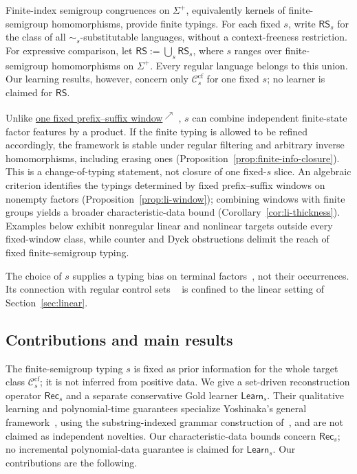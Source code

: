 \documentclass[11pt,a4paper]{article}
\newcommand{\fwdlink}[2]{%
  \hyperlink{#1}{#2\textsuperscript{\(\nearrow\)}}%
}
\theoremstyle{remark}
\theoremstyle{plain}
\newcommand{\cf}{\mathrm{cf}}
\newcommand{\Ccf}[1]{\mathcal C_{#1}^{\cf}}
\begin{document}
Finite-index semigroup congruences on $\Sigma^+$,
equivalently kernels of finite-semigroup homomorphisms,
provide finite typings.  For each fixed $s$,
write $\mathsf{RS}_s$ for the class of all $\sim_s$-substitutable
languages, without a context-freeness restriction.  For expressive
comparison, let
$\mathsf{RS}:=\bigcup_s\mathsf{RS}_s$,
where $s$ ranges over finite-semigroup homomorphisms on $\Sigma^+$.
Every regular language belongs to this union.  Our learning results,
however, concern only $\Ccf{s}$ for one fixed $s$; no learner is
claimed for $\mathsf{RS}$.

Unlike \fwdlink{def:kl-subst}{one fixed prefix--suffix window}, $s$ can combine independent
finite-state factor features by a product.  If the finite typing is allowed
to be refined accordingly, the framework is stable under regular filtering
and arbitrary inverse homomorphisms, including erasing ones
(Proposition~\ref{prop:finite-info-closure}).  This is a
change-of-typing statement, not closure of one fixed-$s$ slice.  An algebraic criterion identifies the typings determined by fixed
prefix--suffix windows on nonempty factors
(Proposition~\ref{prop:li-window}); combining windows with finite groups
yields a broader characteristic-data bound (Corollary~\ref{cor:li-thickness}).
Examples below exhibit nonregular linear and nonlinear targets
outside every fixed-window class, while counter and Dyck obstructions
delimit the reach of fixed finite-semigroup typing.

The choice of $s$ supplies a typing bias on terminal
factors~\cite{coste-typing2004}, not their occurrences.
Its connection with regular control sets
~\cite{takada1988,takada1995} is confined to
the linear setting of Section~\ref{sec:linear}.

\subsection{Contributions and main results}

The finite-semigroup typing $s$ is fixed as prior information
for the whole target class $\Ccf{s}$; it is not inferred
from positive data. We give a set-driven reconstruction operator
$\mathsf{Rec}_s$ and a separate conservative Gold learner
$\mathsf{Learn}_s$. Their qualitative learning and
polynomial-time guarantees specialize Yoshinaka's general
framework~\cite{yoshinaka2015}, using the substring-indexed
grammar construction of~\cite{yoshinaka2008}, and are not
claimed as independent novelties. Our characteristic-data
bounds concern $\mathsf{Rec}_s$; no incremental
polynomial-data guarantee is claimed for $\mathsf{Learn}_s$.
Our contributions are the following.
\end{document}
